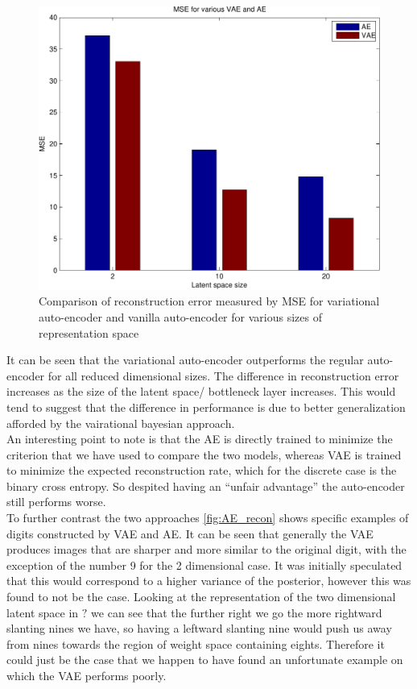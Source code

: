 \documentclass[../report.tex]{subfiles}
\begin{document}
\begin{figure}[hbt]
\centering
\hspace{0em}
\includegraphics[width=0.4\columnwidth]{../../res/mnist_mse.pdf}
\caption{Comparison of reconstruction error measured by MSE for variational auto-encoder and vanilla auto-encoder for various sizes of representation space}
\label{fig:AE_MSE}
\end{figure}

It can be seen that the variational auto-encoder outperforms the regular auto-encoder for all reduced dimensional sizes. The difference in reconstruction error increases as the size of the latent space/ bottleneck layer increases. This would tend to suggest that the difference in performance is due to better generalization afforded by the vairational bayesian approach.\\ An interesting point to note is that the AE is directly trained to minimize the criterion that we have used to compare the two models, whereas VAE is trained to minimize the expected reconstruction rate, which for the discrete case is the binary cross entropy. So despited having an ``unfair advantage'' the auto-encoder still performs worse.\\
To further contrast the two approaches \cref{fig:AE_recon} shows specific examples of digits constructed by VAE and AE. It can be seen that generally the VAE produces images that are sharper and more similar to the original digit, with the exception of the number 9 for the 2 dimensional case. It was initially speculated that this would correspond to a higher variance of the posterior, however this was found to not be the case. Looking at the representation of the two dimensional latent space in $?$ we can see that the further right we go the more rightward slanting nines we have, so having a leftward slanting nine would push us away from nines towards the region of weight space containing eights. Therefore it could just be the case that we happen to have found an unfortunate example on which the VAE performs poorly.\\
\end{document}
